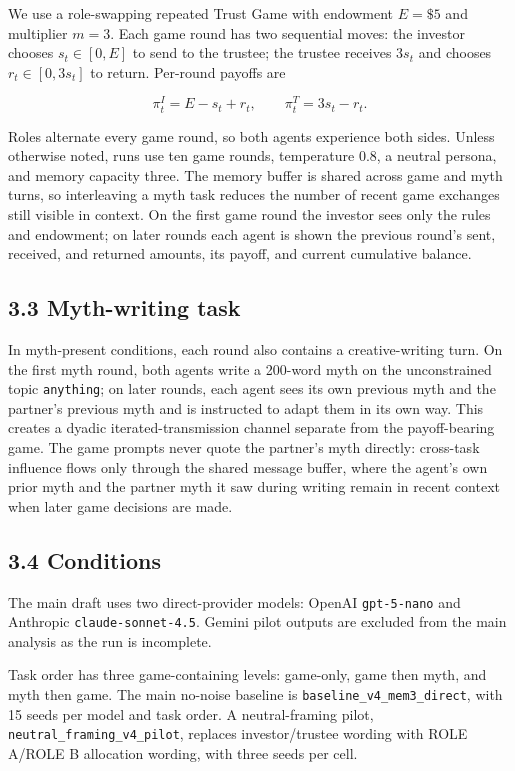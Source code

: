 \documentclass[
  10pt,
  letterpaper,
]{article}
\begin{document}
We use a role-swapping repeated Trust Game with endowment \(E = \$5\)
and multiplier \(m = 3\). Each game round has two sequential moves: the
investor chooses \(s_t \in [0, E]\) to send to the trustee; the trustee
receives \(3s_t\) and chooses \(r_t \in [0, 3s_t]\) to return. Per-round
payoffs are

\[
\pi^I_t = E - s_t + r_t,\qquad \pi^T_t = 3s_t - r_t.
\]

Roles alternate every game round, so both agents experience both sides.
Unless otherwise noted, runs use ten game rounds, temperature 0.8, a
neutral persona, and memory capacity three. The memory buffer is shared
across game and myth turns, so interleaving a myth task reduces the
number of recent game exchanges still visible in context. On the first
game round the investor sees only the rules and endowment; on later
rounds each agent is shown the previous round's sent, received, and
returned amounts, its payoff, and current cumulative balance.

\subsection{3.3 Myth-writing task}\label{myth-writing-task}

In myth-present conditions, each round also contains a creative-writing
turn. On the first myth round, both agents write a 200-word myth on the
unconstrained topic \texttt{anything}; on later rounds, each agent sees
its own previous myth and the partner's previous myth and is instructed
to adapt them in its own way. This creates a dyadic
iterated-transmission channel separate from the payoff-bearing game. The
game prompts never quote the partner's myth directly: cross-task
influence flows only through the shared message buffer, where the
agent's own prior myth and the partner myth it saw during writing remain
in recent context when later game decisions are made.

\subsection{3.4 Conditions}\label{conditions}

The main draft uses two direct-provider models: OpenAI
\texttt{gpt-5-nano} and Anthropic \texttt{claude-sonnet-4.5}. Gemini
pilot outputs are excluded from the main analysis as the run is
incomplete.

Task order has three game-containing levels: game-only, game then myth,
and myth then game. The main no-noise baseline is
\texttt{baseline\_v4\_mem3\_direct}, with 15 seeds per model and task
order. A neutral-framing pilot, \texttt{neutral\_framing\_v4\_pilot},
replaces investor/trustee wording with ROLE A/ROLE B allocation wording,
with three seeds per cell.
\end{document}

